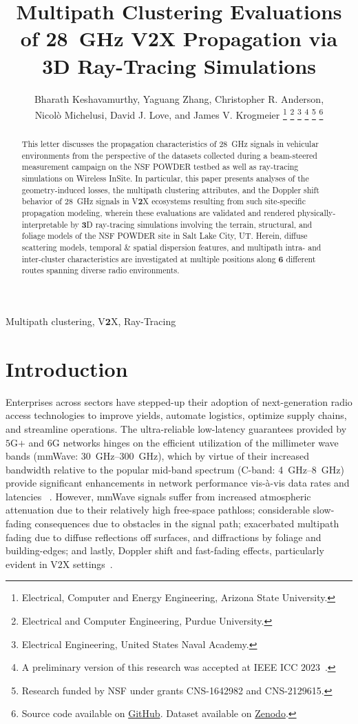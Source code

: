 \documentclass[10pt, twocolumn]{IEEEtran}
\title{Multipath Clustering Evaluations of \SI{28}{\giga\hertz} V2X Propagation via 3D Ray-Tracing Simulations}
\author{Bharath Keshavamurthy\IEEEauthorrefmark{1}, Yaguang Zhang\IEEEauthorrefmark{2}, Christopher R. Anderson\IEEEauthorrefmark{3},\\Nicol\`{o} Michelusi\IEEEauthorrefmark{1}, David J. Love\IEEEauthorrefmark{2}, and James V. Krogmeier\IEEEauthorrefmark{2}
\thanks{\IEEEauthorrefmark{1}Electrical, Computer and Energy Engineering, Arizona State University.}
\thanks{\IEEEauthorrefmark{2}Electrical and Computer Engineering, Purdue University.}
\thanks{\IEEEauthorrefmark{3}Electrical Engineering, United States Naval Academy.}
\thanks{A preliminary version of this research was accepted at IEEE ICC $2023$~\cite{ICC}.}
\thanks{Research funded by NSF under grants CNS-1642982 and CNS-2129615.}
\thanks{Source code available on \href{https://github.com/bharathkeshavamurthy/SPAVE-28G.git}{GitHub}\cite{SPAVE-28G-Software}. Dataset available on \href{https://doi.org/10.5281/zenodo.7178597}{Zenodo}\cite{SPAVE-28G-Dataset}.}
\vspace{-12mm}
}
\begin{document}

\maketitle
\thispagestyle{empty}
\pagestyle{empty}
\vspace{-12mm}

\begin{abstract}
This letter discusses the propagation characteristics of \SI{28}{\giga\hertz} signals in vehicular environments from the perspective of the datasets collected during a beam-steered measurement campaign on the NSF POWDER testbed as well as ray-tracing simulations on Wireless InSite. In particular, this paper presents analyses of the geometry-induced losses, the multipath clustering attributes, and the Doppler shift behavior of \SI{28}{\giga\hertz} signals in V$\mathbf{2}$X ecosystems resulting from such site-specific propagation modeling, wherein these evaluations are validated and rendered physically-interpretable by $\mathbf{3}$D ray-tracing simulations involving the terrain, structural, and foliage models of the NSF POWDER site in Salt Lake City, UT. Herein, diffuse scattering models, temporal \& spatial dispersion features, and multipath intra- and inter-cluster characteristics are investigated at multiple positions along $\mathbf{6}$ different routes spanning diverse radio environments.
\end{abstract}

\begin{IEEEkeywords}
    Multipath clustering, V$\mathbf{2}$X, Ray-Tracing
\end{IEEEkeywords}
\vspace{-3mm}

\section{Introduction}\label{S1}
Enterprises across sectors have stepped-up their adoption of next-generation radio access technologies to improve yields, automate logistics, optimize supply chains, and streamline operations. The ultra-reliable low-latency guarantees provided by $5$G$+$ and $6$G networks hinges on the efficient utilization of the millimeter wave bands (mmWave: \SIrange{30}{300}{\giga\hertz}), which by virtue of their increased bandwidth relative to the popular mid-band spectrum (C-band: \SIrange{4}{8}{\giga\hertz}) provide significant enhancements in network performance vis-\`{a}-vis data rates and latencies ~\cite{mmWaveSurvey}. However, mmWave signals suffer from increased atmospheric attenuation due to their relatively high free-space pathloss; considerable slow-fading consequences due to obstacles in the signal path; exacerbated multipath fading due to diffuse reflections off surfaces, and diffractions by foliage and building-edges; and lastly, Doppler shift and fast-fading effects, particularly evident in V$2$X settings~\cite{Rappaport}.
\end{document}
